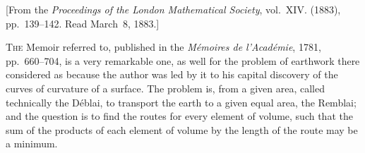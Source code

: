 \documentclass[11pt,a4paper]{article}
\theoremstyle{cayley}
\begin{document}
\begin{center}
[From the \textit{Proceedings of the London Mathematical Society}, vol.~XIV. (1883), pp.~139--142. Read March~8, 1883.]
\end{center}

\textsc{The} Memoir referred to, published in the \textit{M\'{e}moires de l'Acad\'{e}mie}, 1781, pp.~660--704, is a very remarkable one, as well for the problem of earthwork there considered as because the author was led by it to his capital discovery of the curves of curvature of a surface. The problem is, from a given area, called technically the D\'{e}blai, to transport the earth to a given equal area, the Remblai; and the question is to find the routes for every element of volume, such that the sum of the products of each element of volume by the length of the route may be a minimum.
\end{document}
